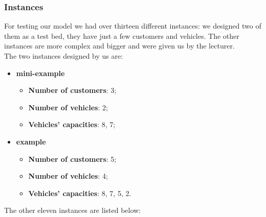 \documentclass[../main.tex]{subfiles}
\begin{document}
\subsubsection{Instances}
\label{subsubsec:instances}
For testing our model we had over thirteen different instances: we designed two of them as a test bed, they have just a few customers and vehicles.
The other instances are more complex and bigger and were given us by the lecturer.\\
The two instances designed by us are:
\begin{itemize}
    \item \textbf{mini-example}
        \begin{itemize}
            \item \textbf{Number of customers}: 3;
            \item \textbf{Number of vehicles}: 2;
            \item \textbf{Vehicles' capacities}: 8, 7;
        \end{itemize}

    \item \textbf{example}
        \begin{itemize}
            \item \textbf{Number of customers}: 5;
            \item \textbf{Number of vehicles}: 4;
            \item \textbf{Vehicles' capacities}: 8, 7, 5, 2.
        \end{itemize}
\end{itemize}
The other eleven instances are listed below:
\end{document}
